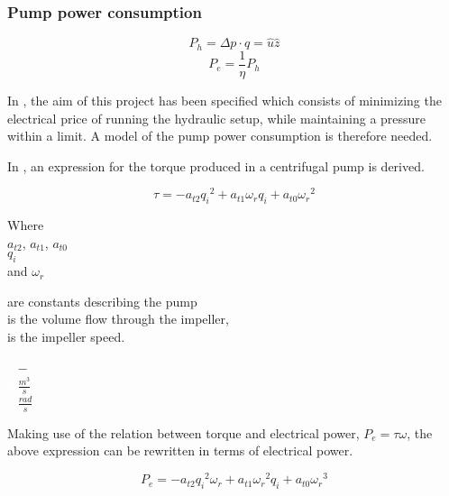 \subsubsection*{Pump power consumption}
\begin{equation}
P_h = \Delta p \cdot q = \hat{u}\hat{z}
\end{equation}
\begin{equation}
P_e = \frac{1}{\eta}P_h
\end{equation}

In , the aim of this project has been specified which consists of minimizing the electrical price of running the hydraulic setup, while maintaining a pressure within a limit. 
A model of the pump power consumption is therefore needed.

In \cite{Phd_Carsten}, an expression for the torque produced in a centrifugal pump is derived. 

\begin{equation}
  \tau = -a_{t2}{q_i}^2 + a_{t1} {\omega}_r {q_i} + a_{t0} {{\omega}_r}^2
  \label{pumptorque}
\end{equation}

\begin{minipage}[t]{0.20\textwidth}
Where\\
\hspace*{8mm} $a_{t2}$, $a_{t1}$, $a_{t0}$ \\
\hspace*{8mm} $q_i$ \\
and \hspace*{0.7mm} $\omega_r$ 

\end{minipage}
\begin{minipage}[t]{0.68\textwidth}
\vspace*{2mm}
are constants describing the pump\\
is the volume flow through the impeller,\\
is the impeller speed.
\end{minipage}
\begin{minipage}[t]{0.10\textwidth}
\vspace*{2mm}
\textcolor{White}{te}$\unit{-}$\\
\textcolor{White}{te}$\unit{\frac{m^3}{s}}$\\
\textcolor{White}{te}$\unit{\frac{rad}{s}}$
\end{minipage}	

Making use of the relation between torque and electrical power, $P_e = \tau \omega$, the above expression can be rewritten in terms of electrical 
power. 

\begin{equation}
  P_e = -a_{t2}{q_i}^2{\omega}_r + a_{t1} {{\omega}_r}^2 {q_i} + a_{t0} {{\omega}_r}^3
  \label{pumptorque}
\end{equation}



